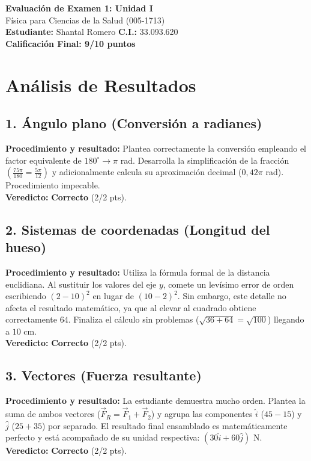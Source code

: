 \documentclass[12pt]{article}
\begin{document}
\begin{center}
    \Large \textbf{Evaluación de Examen 1: Unidad I} \\
    \large Física para Ciencias de la Salud (005-1713) \\
    \vspace{0.5cm}
    \textbf{Estudiante:} Shantal Romero \quad \textbf{C.I.:} 33.093.620
    \vspace{0.3cm} \\
    \large \textbf{Calificación Final: 9/10 puntos}
\end{center}

\vspace{0.5cm}

\section*{Análisis de Resultados}

\subsection*{1. Ángulo plano (Conversión a radianes)}
\textbf{Procedimiento y resultado:} Plantea correctamente la conversión empleando el factor equivalente de $180^\circ \rightarrow \pi$ rad. Desarrolla la simplificación de la fracción $\left(\frac{75\pi}{180} = \frac{5\pi}{12}\right)$ y adicionalmente calcula su aproximación decimal ($0,42\pi$ rad). Procedimiento impecable. \\
\textbf{Veredicto:} \textbf{Correcto} (2/2 pts).

\subsection*{2. Sistemas de coordenadas (Longitud del hueso)}
\textbf{Procedimiento y resultado:} Utiliza la fórmula formal de la distancia euclidiana. Al sustituir los valores del eje $y$, comete un levísimo error de orden escribiendo $(2-10)^2$ en lugar de $(10-2)^2$. Sin embargo, este detalle no afecta el resultado matemático, ya que al elevar al cuadrado obtiene correctamente $64$. Finaliza el cálculo sin problemas ($\sqrt{36+64} = \sqrt{100}$) llegando a $10$ cm. \\
\textbf{Veredicto:} \textbf{Correcto} (2/2 pts).

\subsection*{3. Vectores (Fuerza resultante)}
\textbf{Procedimiento y resultado:} La estudiante demuestra mucho orden. Plantea la suma de ambos vectores ($\vec{F}_R = \vec{F}_1 + \vec{F}_2$) y agrupa las componentes $\hat{i}$ ($45-15$) y $\hat{j}$ ($25+35$) por separado. El resultado final ensamblado es matemáticamente perfecto y está acompañado de su unidad respectiva: $(30\hat{i} + 60\hat{j})$ N. \\
\textbf{Veredicto:} \textbf{Correcto} (2/2 pts).
\end{document}
